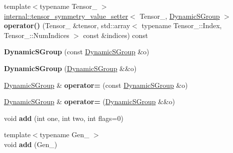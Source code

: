 \begin{DoxyCompactItemize}
\item 
\mbox{\label{class_eigen_1_1_dynamic_s_group_a22aed98eb89f2775943663efec999ae6}} 
{\footnotesize template$<$typename Tensor\+\_\+ $>$ }\\\hyperlink{class_eigen_1_1internal_1_1tensor__symmetry__value__setter}{internal\+::tensor\+\_\+symmetry\+\_\+value\+\_\+setter}$<$ Tensor\+\_\+, \hyperlink{class_eigen_1_1_dynamic_s_group}{Dynamic\+S\+Group} $>$ {\bfseries operator()} (Tensor\+\_\+ \&tensor, std\+::array$<$ typename Tensor\+\_\+\+::\+Index, Tensor\+\_\+\+::\+Num\+Indices $>$ const \&indices) const
\item 
\mbox{\label{class_eigen_1_1_dynamic_s_group_a5f1f473d1f482b43e3b25b560dfc75c7}} 
{\bfseries Dynamic\+S\+Group} (const \hyperlink{class_eigen_1_1_dynamic_s_group}{Dynamic\+S\+Group} \&o)
\item 
\mbox{\label{class_eigen_1_1_dynamic_s_group_aa9bc1a645dabd45f2771bff3f53e438e}} 
{\bfseries Dynamic\+S\+Group} (\hyperlink{class_eigen_1_1_dynamic_s_group}{Dynamic\+S\+Group} \&\&o)
\item 
\mbox{\label{class_eigen_1_1_dynamic_s_group_a1e713d6200cfaa2bfa72d08c18cb0b3a}} 
\hyperlink{class_eigen_1_1_dynamic_s_group}{Dynamic\+S\+Group} \& {\bfseries operator=} (const \hyperlink{class_eigen_1_1_dynamic_s_group}{Dynamic\+S\+Group} \&o)
\item 
\mbox{\label{class_eigen_1_1_dynamic_s_group_a8661b8489f8027f096700433b1890eac}} 
\hyperlink{class_eigen_1_1_dynamic_s_group}{Dynamic\+S\+Group} \& {\bfseries operator=} (\hyperlink{class_eigen_1_1_dynamic_s_group}{Dynamic\+S\+Group} \&\&o)
\item 
\mbox{\label{class_eigen_1_1_dynamic_s_group_ab6d3580987345d4ef81c139e8399147b}} 
void {\bfseries add} (int one, int two, int flags=0)
\item 
\mbox{\label{class_eigen_1_1_dynamic_s_group_a1bdc8d772a461f809baef36a0ad1e21a}} 
{\footnotesize template$<$typename Gen\+\_\+ $>$ }\\void {\bfseries add} (Gen\+\_\+)

\end{DoxyCompactItemize}
